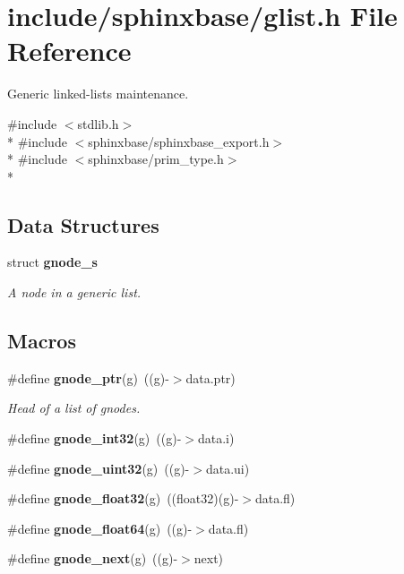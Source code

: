 \section{include/sphinxbase/glist.h File Reference}
\label{glist_8h}


Generic linked-\/lists maintenance.  


{\ttfamily \#include $<$stdlib.\-h$>$}\\*
{\ttfamily \#include $<$sphinxbase/sphinxbase\-\_\-export.\-h$>$}\\*
{\ttfamily \#include $<$sphinxbase/prim\-\_\-type.\-h$>$}\\*
\subsection*{Data Structures}
\begin{DoxyCompactItemize}
\item 
struct {\bf gnode\-\_\-s}
\begin{DoxyCompactList}\small\item\em A node in a generic list. \end{DoxyCompactList}\end{DoxyCompactItemize}
\subsection*{Macros}
\begin{DoxyCompactItemize}
\item 
\#define {\bf gnode\-\_\-ptr}(g)~((g)-\/$>$data.\-ptr)
\begin{DoxyCompactList}\small\item\em Head of a list of gnodes. \end{DoxyCompactList}\item 
\#define {\bfseries gnode\-\_\-int32}(g)~((g)-\/$>$data.\-i)\label{glist_8h_a7daab0205c40d1b449529ee4cc54522b}

\item 
\#define {\bfseries gnode\-\_\-uint32}(g)~((g)-\/$>$data.\-ui)\label{glist_8h_a3af0cc8d5d612e85fa433ac3edf42fd6}

\item 
\#define {\bfseries gnode\-\_\-float32}(g)~((float32)(g)-\/$>$data.\-fl)\label{glist_8h_aaf6a2bdc69642303426c20fc0bdfa5f6}

\item 
\#define {\bfseries gnode\-\_\-float64}(g)~((g)-\/$>$data.\-fl)\label{glist_8h_abfea8eee77afc1e3046ef33ae6c0f5b4}

\item 
\#define {\bfseries gnode\-\_\-next}(g)~((g)-\/$>$next)\label{glist_8h_a33fc794db097ba2a5a36eba12c418993}

\end{DoxyCompactItemize}
